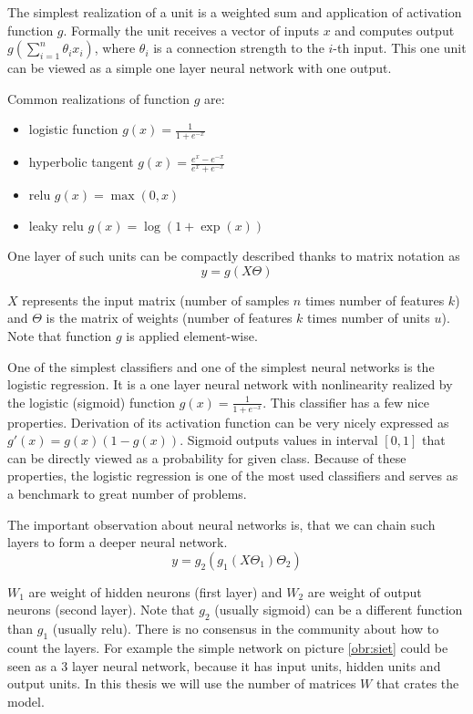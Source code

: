     The simplest realization of a unit is a weighted sum and application of activation function $g$. 
    Formally the unit receives a vector of inputs $x$ and computes output $g(\sum_{i=1}^n \theta_i x_i)$, 
    where $\theta_i$ is a connection strength to the $i$-th input.
    This one unit can be viewed as a simple one layer neural network with one output.
    
    Common realizations of function $g$ are: 
    \begin{itemize}
        \item logistic function $g(x) = \frac{1}{1+e^{-x}}$
        \item hyperbolic tangent $g(x)=\frac{e^x-e^{-x}}{e^x+e^{-x}}$
        \item relu $g(x) = \max(0,x)$ 
        \item leaky relu $g(x)=\log(1+\exp(x))$
    \end{itemize}
    
    One layer of such units can be compactly described thanks to matrix notation as
    $$y=g(X \Theta)$$
    
    $X$ represents the input matrix (number of samples $n$ times number of features $k$) and $\Theta$ is the matrix of weights (number of features $k$ times number of units $u$). Note that function $g$ is applied element-wise.
    
    One of the simplest classifiers and one of the simplest neural networks is the logistic regression.
    It is a one layer neural network with nonlinearity realized by the logistic (sigmoid) function $g(x) = \frac{1}{1+e^{-x}}$.
    This classifier has a few nice properties. 
    Derivation of its activation function can be very nicely expressed as $g'(x) = g(x)(1-g(x))$.
    Sigmoid outputs values in interval $[0,1]$ that can be directly viewed as a probability for given class.
    Because of these properties, the logistic regression is one of the most used classifiers and serves as a benchmark to great number of problems.
    
    
    The important observation about neural networks is, that we can chain such layers to form a deeper neural network.
    $$y=g_2(g_1(X \Theta_1) \Theta_2)$$
    
    $W_1$ are weight of hidden neurons (first layer) and $W_2$ are weight of output neurons (second layer). Note that $g_2$ (usually sigmoid) can be a different function than $g_1$ (usually relu).
    There is no consensus in the community about how to count the layers. 
    For example the simple network on picture \ref{obr:siet} could be seen as a $3$ layer neural network,
    because it has input units, hidden units and output units.
    In this thesis we will use the number of matrices $W$ that crates the model.
    

